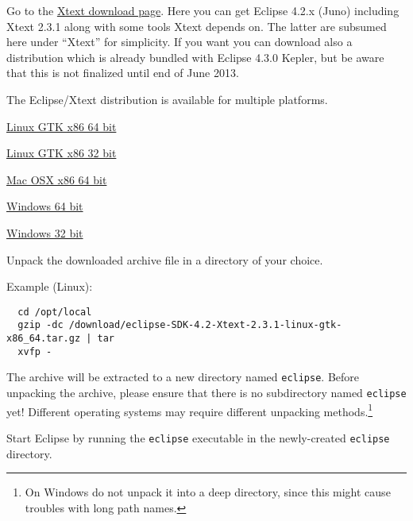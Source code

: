 \begin{compactenum}
    \item Go to the \href{http://xtext.itemis.com/xtext/language=en/36553/downloads/}{Xtext download
    page}. Here you can get Eclipse 4.2.x (Juno) including Xtext 2.3.1
    along with some tools Xtext depends on. The latter are subsumed here under
    ``Xtext'' for simplicity.
    If you want you can download also a distribution
    which is already bundled with Eclipse 4.3.0 Kepler, but be aware that this
    is not finalized until end of June 2013.
    \item The Eclipse/Xtext distribution is available for multiple platforms.

    \begin{compactenum}
      \item
      \href{http://download.itemis.com/distros/eclipse-SDK-4.2-Xtext-2.3.1-linux-gtk-x86_64.tar.gz}{Linux GTK x86 64 bit}
      \item
      \href{http://download.itemis.com/distros/eclipse-SDK-4.2-Xtext-2.3.1-linux-gtk.tar.gz}{Linux GTK x86 32 bit}
        \item
        \href{http://download.itemis.com/distros/eclipse-SDK-4.2-Xtext-2.3.1-macosx-cocoa-x86_64.tar.gz}{Mac OSX x86 64 bit}
        \item
        \href{http://download.itemis.com/distros/eclipse-SDK-4.2-Xtext-2.3.1-win32-x86_64.zip}{Windows 64 bit}
        \item
        \href{http://download.itemis.com/distros/eclipse-SDK-4.2-Xtext-2.3.1-win32.zip}{Windows 32 bit}
    \end{compactenum}

    \item Unpack the downloaded archive file in a directory of your choice.

        Example (Linux):

\begin{lstlisting}
  cd /opt/local
  gzip -dc /download/eclipse-SDK-4.2-Xtext-2.3.1-linux-gtk-x86_64.tar.gz | tar
  xvfp -
\end{lstlisting}

        The archive will be extracted to a new directory named \texttt{eclipse}. Before
        unpacking the archive, please ensure that there is no subdirectory named
        \texttt{eclipse} yet! Different operating systems may require different unpacking
        methods.\footnote{On Windows do not unpack it into a deep directory,
        since this might cause troubles with long path names.}

    \item Start Eclipse by running the \texttt{eclipse} executable in the newly-created
    \texttt{eclipse} directory.
\end{compactenum}
